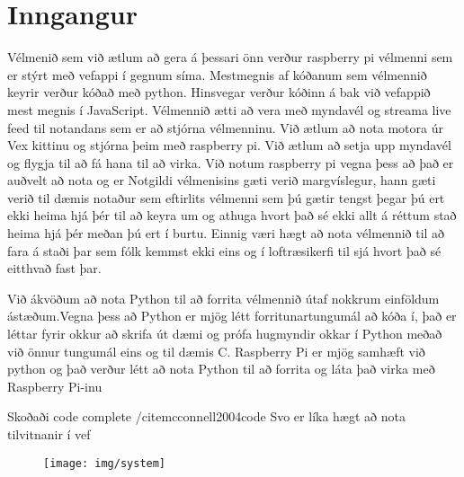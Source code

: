 \section{Inngangur}
Vélmenið sem við ætlum að gera á þessari önn verður raspberry pi vélmenni sem er stýrt með vefappi í gegnum síma. Mestmegnis af kóðanum sem vélmennið keyrir verður kóðað með python. Hinsvegar verður kóðinn á bak við vefappið mest megnis í JavaScript. Vélmennið ætti að vera með myndavél og streama live feed til notandans sem er að stjórna vélmenninu. Við ætlum að nota motora úr Vex kittinu og stjórna þeim með raspberry pi. Við ætlum að setja upp myndavél og flygja \cite{prasad2014smart} til að fá hana til að virka. Við notum raspberry pi vegna þess að það er auðvelt að nota og er 
Notgildi vélmenisins gæti verið margvíslegur, hann gæti verið til dæmis notaður sem eftirlits vélmenni sem þú gætir tengst þegar þú ert ekki heima hjá þér til að keyra um og athuga hvort það sé ekki allt á réttum stað heima hjá þér meðan þú ert í burtu. Einnig væri hægt að nota vélmennið til að fara á staði þar sem fólk kemmst ekki eins og í loftræsikerfi til sjá hvort það sé eitthvað fast þar.

Við ákvöðum að nota Python til að forrita vélmennið útaf nokkrum einföldum ástæðum.Vegna þess að Python er mjög létt forritunartungumál að kóða í, það er léttar fyrir okkur að skrifa út dæmi og prófa hugmyndir okkar í Python meðað við önnur tungumál eins og til dæmis C. Raspberry Pi er mjög samhæft við python og það verður létt að nota Python til að forrita og láta það virka með Raspberry Pi-inu


Skoðaði code complete /cite{mcconnell2004code}
Svo er líka hægt að nota tilvitnanir í vef \cite{WinNT}
\begin{figure}[h]
\texttt{[image: img/system]}
\end{figure}
